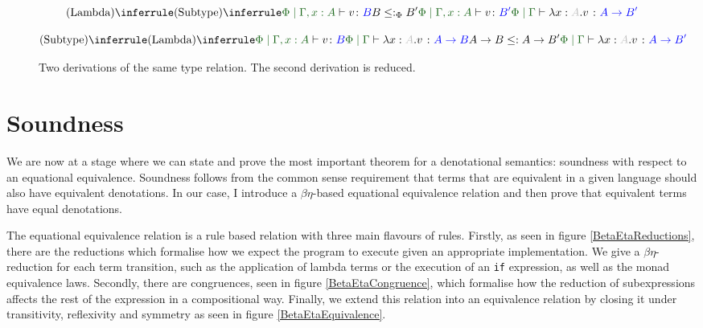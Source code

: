 \documentclass{Report}
\begin{document}
\begin{figure}[h!]
\begin{equation}
    \ntreeruleI{Lambda}{
        \ntreeruleII{Subtype}{
            \etyperelation{\P}{\gax}{v}{B}
        }{
            B \subtypep B'
        }{
            \etyperelation{\P}{\gax}{v}{B'}
        }
    }{\gpetyperelation{\lam{x}{A}{v}}{\fntype{A}{B'}}}
\end{equation}

\begin{equation}
    \ntreeruleII{Subtype}{ 
           \ntreeruleI{Lambda}{
            \etyperelation{\P}{\gax}{v}{B}
    }{\gpetyperelation{\lam{x}{A}{v}}{\fntype{A}{B}}}
    }{ \ab \subtype \fntype{A}{B'}}
    {\gpetyperelation{\lam{x}{A}{v}}{\fntype{A}{B'}}}
\end{equation}
    \caption{Two derivations of the same type relation. The second derivation is reduced.}
\end{figure}

\section{Soundness}
We are now at a stage where we can state and prove the most important theorem for a denotational semantics: soundness with respect to an equational equivalence. Soundness follows from the common sense requirement that terms that are equivalent in a given language should also have equivalent denotations. In our case, I introduce a $\beta\eta$-based equational equivalence relation and then prove that equivalent terms have equal denotations.

The equational equivalence relation is a rule based relation with three main flavours of rules. Firstly, as seen in figure \ref{BetaEtaReductions}, there are the reductions which formalise how we expect the program to execute given an appropriate implementation. We give a $\beta\eta$-reduction for each term transition, such as the application of lambda terms or the execution of an \texttt{if} expression, as well as the monad equivalence laws. Secondly, there are congruences, seen in figure \ref{BetaEtaCongruence}, which formalise how the reduction of subexpressions affects the rest of the expression in a compositional way. Finally, we extend this relation into an equivalence relation by closing it under transitivity, reflexivity and symmetry as seen in figure \ref{BetaEtaEquivalence}.
\end{document}
